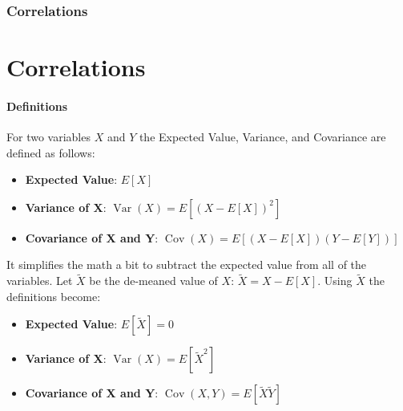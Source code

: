 \documentclass{beamer}
\begin{document}
\begin{foundframe}
    \frametitle{Correlations}
    \section{Correlations}
    \framesubtitle{Definitions}

    For two variables $X$ and $Y$ the Expected Value, Variance, and Covariance are defined as follows:\\

    \begin{itemize}
        \item   \textbf{Expected Value}: $E[X]$
        \item   \textbf{Variance of X}: $\operatorname{Var}(X) = E[(X-E[X])^2]$
        \item   \textbf{Covariance of X and Y}: $\operatorname{Cov}(X) = E[(X-E[X])(Y-E[Y])]$
    \end{itemize}

    It simplifies the math a bit to subtract the expected value from all of the variables.   Let $\tilde{X}$ be the de-meaned value of $X$: $\tilde{X} = X - E[X]$.   Using $\tilde{X}$ the definitions become:
        \begin{itemize}
        \item   \textbf{Expected Value}: $E[\tilde{X}] = 0$
        \item   \textbf{Variance of X}: $\operatorname{Var}(X) = E[\tilde{X}^2]$
        \item   \textbf{Covariance of X and Y}: $\operatorname{Cov}(X,Y) = E[\tilde{X}\tilde{Y}]$
    \end{itemize}


\end{foundframe}
\end{document}
